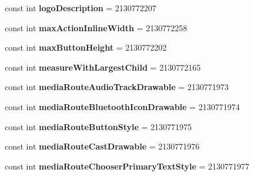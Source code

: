 \begin{DoxyCompactItemize}
const int {\bfseries logo\+Description} = 2130772207
\item 
\mbox{\label{class_pinned_app_1_1_droid_1_1_resource_1_1_attribute_a1ff1438505f5fd66ee87eb95b4315a67}} 
const int {\bfseries max\+Action\+Inline\+Width} = 2130772258
\item 
\mbox{\label{class_pinned_app_1_1_droid_1_1_resource_1_1_attribute_a4a403da8b01ba6e23106908361f0cc52}} 
const int {\bfseries max\+Button\+Height} = 2130772202
\item 
\mbox{\label{class_pinned_app_1_1_droid_1_1_resource_1_1_attribute_a73367df37c9cbcfb54b85dfca46cabb4}} 
const int {\bfseries measure\+With\+Largest\+Child} = 2130772165
\item 
\mbox{\label{class_pinned_app_1_1_droid_1_1_resource_1_1_attribute_afc7022f14452cf594cdb3000693ef1e8}} 
const int {\bfseries media\+Route\+Audio\+Track\+Drawable} = 2130771973
\item 
\mbox{\label{class_pinned_app_1_1_droid_1_1_resource_1_1_attribute_a69f239d529e71be2363d5bcf55c154a4}} 
const int {\bfseries media\+Route\+Bluetooth\+Icon\+Drawable} = 2130771974
\item 
\mbox{\label{class_pinned_app_1_1_droid_1_1_resource_1_1_attribute_acdd9225fa7936e6ecfb21dc3e53c93eb}} 
const int {\bfseries media\+Route\+Button\+Style} = 2130771975
\item 
\mbox{\label{class_pinned_app_1_1_droid_1_1_resource_1_1_attribute_a85857e0975885da78054217a8a9ebd05}} 
const int {\bfseries media\+Route\+Cast\+Drawable} = 2130771976
\item 
\mbox{\label{class_pinned_app_1_1_droid_1_1_resource_1_1_attribute_a642c4e3e81da092e104b3f9933f876c8}} 
const int {\bfseries media\+Route\+Chooser\+Primary\+Text\+Style} = 2130771977

\end{DoxyCompactItemize}
